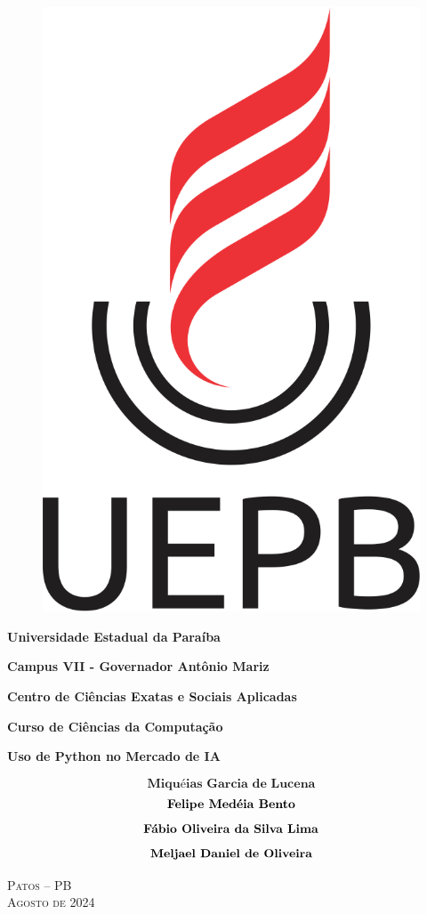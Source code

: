 \thispagestyle{empty}
\begin{center}

\begin{singlespace}
\begin{figure}[!htb]
    \centering
    \includegraphics[width=0.1\linewidth]{img/logo-uepb.png}
\end{figure}
{\Large{\textbf{ Universidade Estadual da Paraíba }}}

{\large{\textbf{ Campus VII - Governador Antônio Mariz }}}

{\large{\textbf{ Centro de Ciências Exatas e Sociais Aplicadas }}}

{\large{\textbf{ Curso de Ciências da Computação }}}
\end{singlespace}


\vspace{4.0cm}

\textbf{ \huge{{ Uso de Python no Mercado de IA }}}

\vspace {3cm}

{\Large{$$\textbf {Miquéias Garcia de Lucena}$$$$\newline\textbf {Felipe Medéia Bento}$$$$\newline\textbf {Fábio Oliveira da Silva Lima}$$$$\newline\textbf {Meljael Daniel de Oliveira}$$}}

\vspace{3cm}

\begin{singlespace}

\large{\textsc{Patos -- PB}}\\
\large{\textsc{Agosto de 2024}}

\end{singlespace}

\end{center}

\pagebreak


\thispagestyle{empty}

